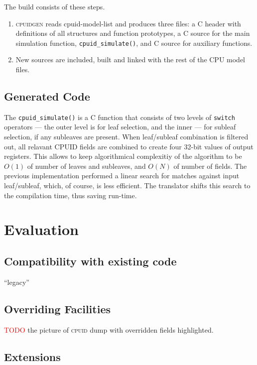 \documentclass[a4paper,10pt,oneside,unicode]{article}
\newcommand{\cpuid}{\textsc{cpuid} }
\newcommand{\cpuidgen}{\textsc{cpuidgen} }
\newcommand{\todo}[1][]{\textcolor{red}{TODO #1}}
\begin{document}
The build consists of these steps.
\begin{enumerate}
    \item \cpuidgen reads cpuid-model-list and produces three files: a C header with definitions of all structures and function prototypes, a C source for the main simulation function, \texttt{cpuid\_simulate()}, and C source for auxiliary functions.
    \item New sources are included, built and linked with the rest of the CPU model files.
\end{enumerate}

\subsection{Generated Code}

The \texttt{cpuid\_simulate()} is a C function that consists of two levels of \texttt{switch} operators --- the outer level is for leaf selection, and the inner --- for subleaf selection, if any subleaves are present. When leaf/subleaf combination is filtered out, all relavant CPUID fields are combined to create four 32-bit values of output registers. This allows to keep algorithmical complexitiy of the algorithm to be $O(1)$ of number of leaves and subleaves, and $O(N)$ of number of fields. The previous implementation performed a linear search for matches against input leaf/subleaf, which, of course, is less efficient. The translator shifts this search to the compilation time, thus saving run-time.

\section{Evaluation}\label{sec:evaluation}

\subsection{Compatibility with existing code}

“legacy” 

\subsection{Overriding Facilities}

\todo the picture of \cpuid dump with overridden fields highlighted.


\subsection{Extensions}
\end{document}
